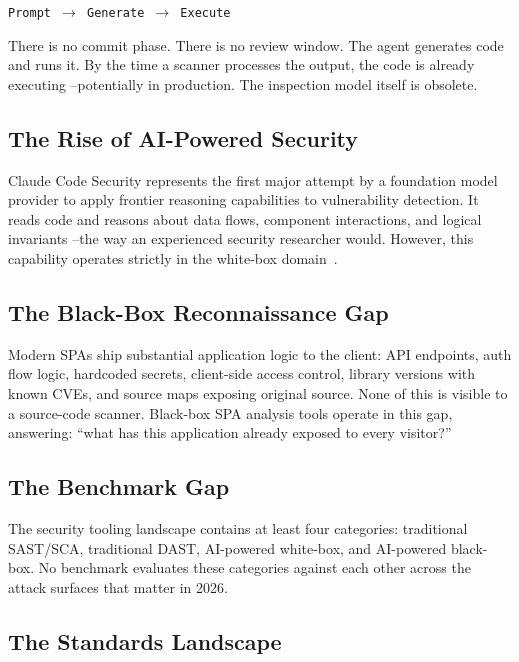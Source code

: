 \documentclass[11pt,twocolumn]{article}
\begin{document}
\begin{center}
\texttt{Prompt $\rightarrow$ Generate $\rightarrow$ Execute}
\end{center}

There is no commit phase. There is no review window. The agent generates code and runs it. By the time a scanner processes the output, the code is already executing --potentially in production. The inspection model itself is obsolete.

\subsection{The Rise of AI-Powered Security}

Claude Code Security represents the first major attempt by a foundation model provider to apply frontier reasoning capabilities to vulnerability detection. It reads code and reasons about data flows, component interactions, and logical invariants --the way an experienced security researcher would. However, this capability operates strictly in the white-box domain~\cite{anthropic2026}.

\subsection{The Black-Box Reconnaissance Gap}

Modern SPAs ship substantial application logic to the client: API endpoints, auth flow logic, hardcoded secrets, client-side access control, library versions with known CVEs, and source maps exposing original source. None of this is visible to a source-code scanner. Black-box SPA analysis tools operate in this gap, answering: ``what has this application already exposed to every visitor?''

\subsection{The Benchmark Gap}

The security tooling landscape contains at least four categories: traditional SAST/SCA, traditional DAST, AI-powered white-box, and AI-powered black-box. No benchmark evaluates these categories against each other across the attack surfaces that matter in 2026.

\subsection{The Standards Landscape}
\end{document}
